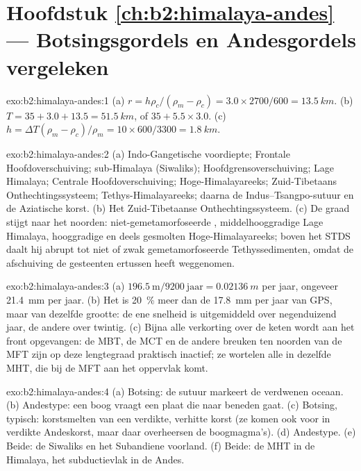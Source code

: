 \section*{Hoofdstuk \ref{ch:b2:himalaya-andes} --- Botsingsgordels en Andesgordels vergeleken}

\begin{solution}{exo:b2:himalaya-andes:1}
(a) $r = h\rho_c/(\rho_m - \rho_c) = 3.0\times2700/600 = \qty{13.5}{km}$. (b) $T = 35 + 3.0 +
13.5 = \qty{51.5}{km}$, of $35 + 5.5\times3.0$. (c) $h = \Delta T(\rho_m - \rho_c)/\rho_m =
10\times600/3300 = \qty{1.8}{km}$.
\end{solution}

\begin{solution}{exo:b2:himalaya-andes:2}
(a) Indo-Gangetische voordiepte; Frontale Hoofdoverschuiving; sub-Himalaya (Siwaliks);
Hoofdgrensoverschuiving; Lage Himalaya; Centrale Hoofdoverschuiving; Hoge-Himalayareeks; Zuid-Tibetaans
Onthechtingssysteem; Tethys-Himalayareeks; daarna de Indus--Tsangpo-sutuur en de Aziatische
korst. (b) Het Zuid-Tibetaanse Onthechtingssysteem. (c) De graad stijgt naar het noorden: niet-gemetamorfoseerde
, middelhooggradige Lage Himalaya, hooggradige en deels gesmolten
Hoge-Himalayareeks; boven het STDS daalt hij abrupt tot niet of zwak gemetamorfoseerde
Tethyssedimenten, omdat de afschuiving de gesteenten ertussen heeft weggenomen.
\end{solution}

\begin{solution}{exo:b2:himalaya-andes:3}
(a) $196.5\ \text{m}/9200\ \text{jaar} = \qty{0.02136}{m}$ per jaar, ongeveer \qty{21.4}{mm} per jaar.
(b) Het is \qty{20}{\percent} meer dan de \qty{17.8}{mm} per jaar van GPS, maar van dezelfde grootte:
de ene snelheid is uitgemiddeld over negenduizend jaar, de andere over twintig.
(c) Bijna alle verkorting over de keten wordt aan het front opgevangen: de MBT, de MCT en
de andere breuken ten noorden van de MFT zijn op deze lengtegraad praktisch inactief; ze wortelen alle
in dezelfde MHT, die bij de MFT aan het oppervlak komt.
\end{solution}

\begin{solution}{exo:b2:himalaya-andes:4}
(a) Botsing: de sutuur markeert de verdwenen oceaan. (b) Andestype: een boog vraagt een plaat
die naar beneden gaat. (c) Botsing, typisch: korstsmelten van een verdikte, verhitte korst (ze komen ook
voor in verdikte Andeskorst, maar daar overheersen de boogmagma's). (d) Andestype.
(e) Beide: de Siwaliks en het Subandiene voorland. (f) Beide: de MHT in de Himalaya, het
subductievlak in de Andes.
\end{solution}

